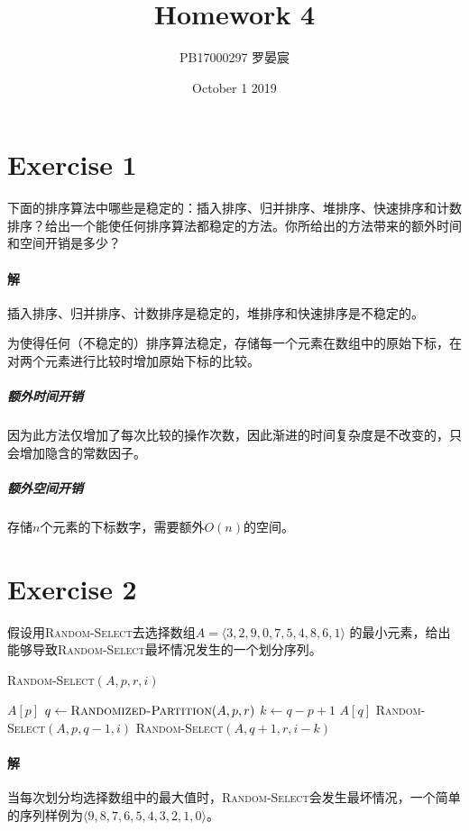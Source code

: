 \documentclass{article}
\title{Homework 4}
\author{PB17000297 罗晏宸}
\date{October 1 2019}
\begin{document}
\maketitle

\section{Exercise 1}
下面的排序算法中哪些是稳定的：插入排序、归并排序、堆排序、快速排序和计数排序？给出一个能使任何排序算法都稳定的方法。你所给出的方法带来的额外时间和空间开销是多少？
\\
\paragraph{解}
插入排序、归并排序、计数排序是稳定的，堆排序和快速排序是不稳定的。\par
为使得任何（不稳定的）排序算法稳定，存储每一个元素在数组中的原始下标，在对两个元素进行比较时增加原始下标的比较。\par
\subparagraph{额外时间开销}
因为此方法仅增加了每次比较的操作次数，因此渐进的时间复杂度是不改变的，只会增加隐含的常数因子。
\subparagraph{额外空间开销}
存储$n$个元素的下标数字，需要额外$O(n)$的空间。
\\

\section{Exercise 2}
假设用\textsc{Random-Select}去选择数组$A = \langle 3,2,9,0,7,5,4,8,6,1 \rangle$ 的最小元素，给出能够导致\textsc{Random-Select}最坏情况发生的一个划分序列。

\begin{algorithm}[H]
    \textsc{Random-Select}$(A,p,r,i)$
    \begin{algorithmic}[1]
    \RETURN $A[p]$
    \ENDIF
    \STATE $q \gets \textsc{Randomized-Partition}(A,p,r)$
    \STATE $k \gets q - p + 1$
    \RETURN $A[q]$
    \ELSE
    \RETURN \textsc{Random-Select}$(A,p,q-1,i)$
    \ELSE
    \RETURN \textsc{Random-Select}$(A,q+1,r,i-k)$
    \ENDIF
    \ENDIF
    \end{algorithmic}
\end{algorithm}

\paragraph{解}
当每次划分均选择数组中的最大值时，\textsc{Random-Select}会发生最坏情况，一个简单的序列样例为$\langle 9,8,7,6,5,4,3,2,1,0 \rangle$。
\\
\end{document}
